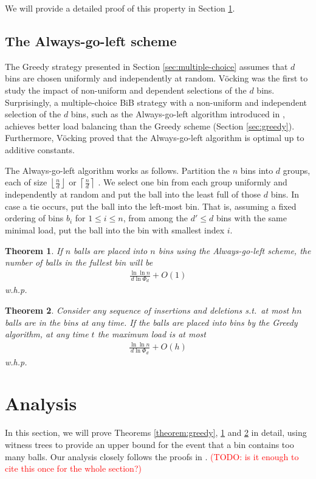 \documentclass[a4paper,12pt]{article}
\newcommand\todo[1]{\textcolor{red}{(TODO: #1)}}
\newtheorem{theorem}{Theorem}
\begin{document}
We will provide a detailed proof of this property in Section \ref{sec:analysis}.

\subsection{The Always-go-left scheme}
\label{sec:AlwaysGoLeft}
The Greedy strategy presented in Section \ref{sec:multiple-choice} assumes that $d$ bins are chosen uniformly and independently at random. V\"ocking \cite{VOC03} was the first to study the impact of non-uniform and dependent selections of the $d$ bins. Surprisingly, a multiple-choice BiB strategy with a non-uniform and independent selection of the $d$ bins, such as the Always-go-left algorithm introduced in \cite{VOC03}, achieves better \cite{BCSV06} load balancing than the Greedy scheme (Section \ref{sec:greedy}). Furthermore, V\"ocking proved that the Always-go-left algorithm is optimal up to additive constants.

The Always-go-left algorithm works as follows. Partition the $n$ bins into $d$ groups, each of size $\left\lfloor \frac{n}{d}\right\rfloor$ or $\left\lceil\frac{n}{d}\right\rceil$ . We select one bin from each group uniformly and independently at random and put the ball into the least full of those $d$ bins. In case a tie occurs, put the ball into the left-most bin. That is, assuming a fixed ordering of bins $b_i$ for $1 \leq i \leq n$, from among the $d' \leq d$ bins with the same minimal load, put the ball into the bin with smallest index $i$.

\begin{theorem}
\label{theorem:agln}
If $n$ balls are placed into $n$ bins using the Always-go-left scheme, the number of balls in the fullest bin will be 
\begin{align*}
\frac{\ln\ln n}{d  \ln \Phi_d} + O(1)
\end{align*}
w.h.p.
\end{theorem}

\begin{theorem}
\label{theorem:algm}
Consider any sequence of insertions and deletions s.t.~at most $hn$ balls are in the bins at any time. If the balls are placed into bins by the Greedy algorithm, at any time $t$ the maximum load is at most 
\begin{align*}
\frac{\ln\ln n}{d  \ln \Phi_d} + O(h)
\end{align*}
w.h.p.
\end{theorem}

\section{Analysis}
\label{sec:analysis}
In this section, we will prove Theorems \ref{theorem:greedy}, \ref{theorem:agln} and \ref{theorem:algm} in detail, using witness trees to provide an upper bound for the event that a bin contains too many balls. Our analysis closely follows the proofs in \cite{VOC03}. \todo{is it enough to cite this once for the whole section?}
\end{document}
